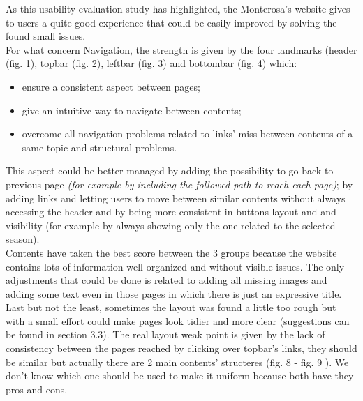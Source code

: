 As this usability evaluation study has highlighted, the Monterosa's website gives to users a quite good experience that could be easily improved by solving the found small issues.\\ 
For what concern Navigation, the strength is given by the four landmarks (header (fig. 1), topbar (fig. 2), leftbar (fig. 3) and bottombar (fig. 4)  which:
\begin{itemize}
	\item ensure a consistent aspect between pages;
	\item give an intuitive way to navigate between contents;
	\item overcome all navigation problems related to links' miss between contents of a same topic and structural problems.
\end{itemize}
This aspect could be better managed by adding the possibility to go back to previous page \emph{(for example by including the followed path to reach each page)}; by adding links and letting users to move between similar contents without always accessing the header and by being more consistent in buttons layout and and visibility (for example by always showing only the one related to the selected season).\\Contents have taken the best score between the 3 groups because the website contains lots of information well organized and without visible issues. The only adjustments that could be done is related to adding all missing images and adding some text even in those pages in which there is just an expressive title.\\ Last but not the least, sometimes the layout was found a little too rough but with a small effort could make pages look tidier and more clear (suggestions can be found in section 3.3). The real layout weak point is given by the lack of consistency between the pages reached by clicking over topbar's links,  they should be similar but actually there are 2 main contents' structeres (fig. 8 - fig. 9 ). We don't know which one should be used to make it uniform because both have they pros and cons.

